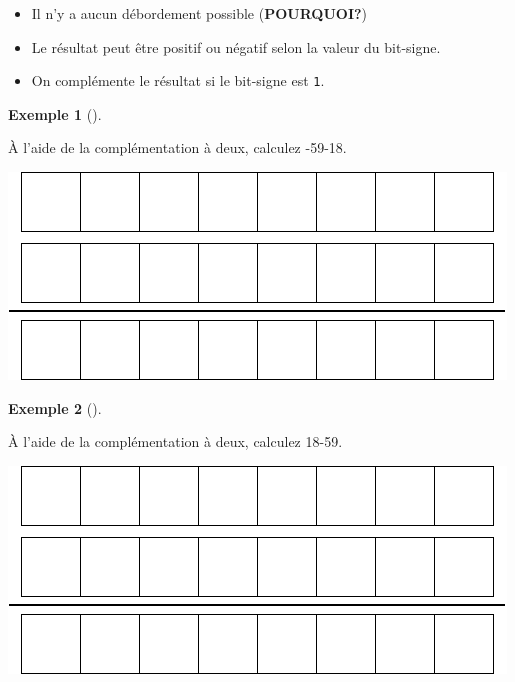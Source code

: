 \documentclass[
  letterpaper,
]{scrbook}
\providecommand{\tightlist}{%
  \setlength{\itemsep}{0pt}\setlength{\parskip}{0pt}}\usepackage{longtable,booktabs,array}
\theoremstyle{plain}
\theoremstyle{definition}
\newtheorem{example}{Exemple}[chapter]
\theoremstyle{definition}
\theoremstyle{remark}
\begin{document}
\begin{itemize}
\tightlist
\item
  Il n'y a aucun débordement possible (\textbf{POURQUOI?})
\item
  Le résultat peut être positif ou négatif selon la valeur du bit-signe.
\item
  On complémente le résultat si le bit-signe est \texttt{1}.
\end{itemize}

\leavevmode{}%
\begin{example}[]\label{exm-addition-complement-deux-5}

À l'aide de la complémentation à deux, calculez -59-18.

\includegraphics{./systeme_numeration_files/figure-pdf/unnamed-chunk-12-1.pdf}

\end{example}

\leavevmode{}%
\begin{example}[]\label{exm-addition-complement-deux-6}

À l'aide de la complémentation à deux, calculez 18-59.

\includegraphics{./systeme_numeration_files/figure-pdf/unnamed-chunk-13-1.pdf}

\end{example}
\end{document}
